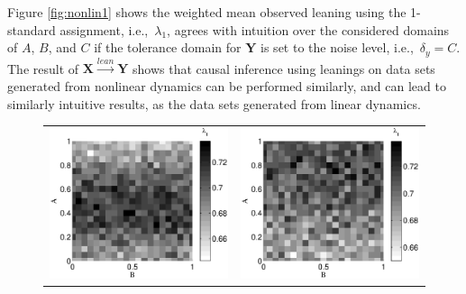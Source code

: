 \documentclass[twocolumn,aps,pre,groupedaddress]{revtex4-1}
\begin{document}
Figure \ref{fig:nonlin1} shows the weighted mean observed leaning using the 1-standard assignment, i.e.,\ $\lambda_1$, agrees with intuition over the considered domains of $A$, $B$, and $C$ if the tolerance domain for $\mathbf{Y}$ is set to the noise level, i.e.,\ $\delta_y = C$.  The result of $\mathbf{X}\xrightarrow{lean}\mathbf{Y}$ shows that causal inference using leanings on data sets generated from nonlinear dynamics can be performed similarly, and can lead to similarly intuitive results, as the data sets generated from linear dynamics.
\begin{figure}[ht]
\begin{tabular}{cc}
\includegraphics[scale=0.30]{NonlinearCyclicexample_BxytolC02.eps} &
\includegraphics[scale=0.30]{NonlinearCyclicexample_BxytolC04.eps} \\

\end{tabular}
\end{figure}
\end{document}
